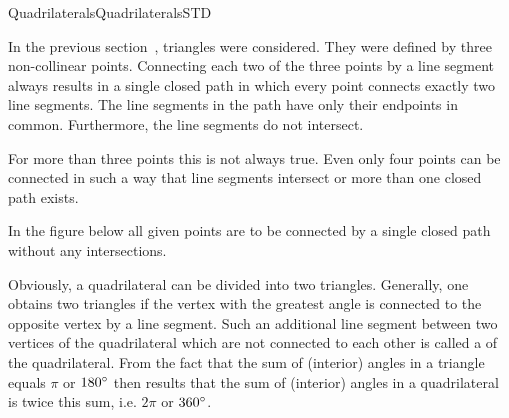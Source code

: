 \begin{MXContent}{Quadrilaterals}{Quadrilaterals}{STD}

In the previous section~, triangles were considered.
They were defined by three non-collinear points. Connecting each two of the three points 
by a line segment always results in a single closed path in which
every point connects exactly two line segments. The line segments in the path
have only their endpoints in common. Furthermore, the line segments do not intersect. 

For more than three points this is not always true. Even only four points 
can be connected in such a way that line segments intersect or more than one
closed path exists.

In the figure below all given points are to be connected by a single closed path 
without any intersections.

\begin{center}
\end{center}

Obviously, a quadrilateral can be divided into two triangles. Generally, one 
obtains two triangles if the vertex with the greatest angle is connected to 
the opposite vertex by a line segment. Such an additional line segment between 
two vertices of the quadrilateral which are not connected to each other is called a 
 of the quadrilateral. From the fact that 
the sum of (interior) angles in a triangle equals $\pi$ or $180^{\circ}$ 
then results that the sum of (interior) angles in a quadrilateral is twice 
this sum, i.e. $2 \pi$ or $360^{\circ}$. 



\end{MXContent}
